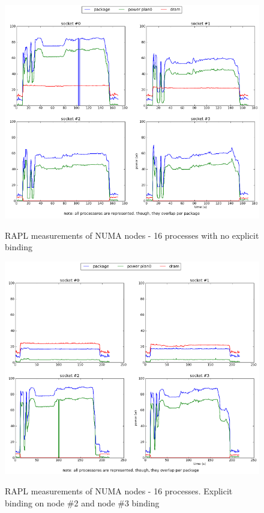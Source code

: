 \begin{figure}[h!]
  \centering
    \includegraphics[width=150mm]{"img/numa/16proc_no_binding"}
    \label{fig:nf_ss}
    \caption{RAPL measurements of NUMA nodes - 16 processes with no explicit
binding}
\end{figure}


\begin{figure}[h!]
  \centering
    \includegraphics[width=150mm]{"img/numa/16proc_node2and3"}
    \label{fig:nf_ss}
    \caption{RAPL measurements of NUMA nodes - 16 processes. Explicit binding 
on node \#2 and node \#3 binding}
\end{figure}


